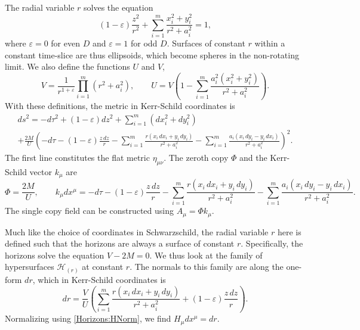 The radial variable $r$ solves the equation
\begin{equation}  
    \left(1 - \varepsilon\right) \frac{z^{2}}{r^{2}} + \sum_{i = 1}^{m} \frac{x_{i}^{2} + y_{i}^{2}}{r^{2} +
    a_{i}^{2}} = 1,
\end{equation}
where $\varepsilon = 0$ for even $D$ and $\varepsilon = 1$ for odd $D$. Surfaces of constant $r$ within a constant
time-slice are thus ellipsoids, which become spheres in the non-rotating limit. We also define the functions $U$
and $V$,
\begin{equation}  
    V = \frac{1}{r^{1 + \varepsilon}} \prod_{i = 1}^{m}\left(r^{2} + a_{i}^{2}\right), \qquad U = V\left(1 -
    \sum_{i = 1}^{m} \frac{a_{i}^{2} \left(x_{i}^{2} + y_{i}^{2}\right)}{r^{2} + a_{i}^{2}}\right).
\end{equation}
With these definitions, the metric in Kerr-Schild coordinates is
\begin{multline}  
    ds^{2} = -d\tau^{2} + \left(1-\varepsilon \right) dz^{2} + \sum_{i = 1}^{m} \left(dx_{i}^{2} +
    dy_{i}^{2}\right) \\
    + \frac{2M}{U} \left( -d\tau - \left(1 - \varepsilon\right) \frac{z\, dz}{r} - \sum_{i = 1}^{m} \frac{r
    \left(x_{i}\, dx_{i} + y_{i}\, dy_{i}\right)}{r^{2} + a_{i}^{2}} - \sum_{i = 1}^{m} \frac{a_{i} \left(x_{i} \,
    dy_{i} - y_{i} \, dx_{i}\right)}{r^{2} + a_{i}^{2}}\right)^{2}.
\end{multline}
The first line constitutes the flat metric $\eta_{\mu \nu}$. The zeroth copy $\Phi$ and the Kerr-Schild vector
$k_{\mu}$ are
\begin{equation}  
    \Phi = \frac{2M}{U}, \qquad k_{\mu} dx^{\mu} = -d\tau - \left(1 - \varepsilon\right) \frac{z\,dz}{r} -
    \sum_{i = 1}^{m} \frac{r\left(x_{i}\, dx_{i} + y_{i} \, dy_{i}\right)}{r^{2} + a_{i}^{2}} - \sum_{i = 1}^{m}
    \frac{a_{i} \left(x_{i} \, dy_{i} - y_{i}\, dx_{i}\right)}{r^{2} + a_{i}^{2}}.
\end{equation}
The single copy field can be constructed using $A_{\mu} = \Phi k_{\mu}$.

Much like the choice of coordinates in Schwarzschild, the radial variable $r$ here is defined such that the
horizons are always a surface of constant $r$. Specifically, the horizons solve the equation $V - 2M = 0$. We thus
look at the family of hypersurfaces $\mathcal{H}_{(r)}$ at constant $r$. The normals to this family are along the
one-form $dr$, which in Kerr-Schild coordinates is
\begin{equation}  
    dr = \frac{V}{U} \left( \sum_{i=1}^{m} \frac{r\left(x_{i}\, dx_{i} + y_{i} \, dy_{i}\right)}{r^{2} +
    a_{i}^{2}} + \left(1-\varepsilon\right) \frac{z\,dz}{r}\right).
\end{equation}
Normalizing using \eqref{Horizons:HNorm}, we find $H_{\mu}dx^{\mu} = dr$. 

